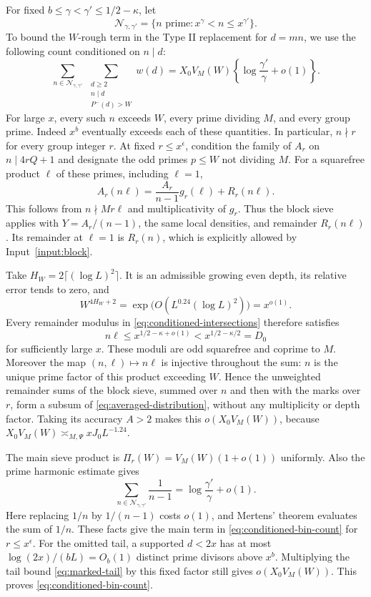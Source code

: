 For fixed $b\le\gamma<\gamma'\le1/2-\kappa$, let
\[
 \mathcal N_{\gamma,\gamma'}
     =\{n\text{ prime}:x^\gamma<n\le x^{\gamma'}\}.
\]
To bound the $W$-rough term in the Type II replacement for $d=mn$, we use
the following count conditioned on $n\mid d$:
\begin{equation}\label{eq:conditioned-bin-count}
 \sum_{n\in\mathcal N_{\gamma,\gamma'}}
 \ \sum_{\substack{d\ge2\\n\mid d\\P^-(d)>W}}w(d)
 =X_0V_M(W)\left\{\log\frac{\gamma'}\gamma+o(1)\right\}.
\end{equation}
For large $x$, every such $n$ exceeds $W$, every prime dividing $M$,
and every group prime.  Indeed $x^b$ eventually exceeds each of these
quantities.  In particular, $n\nmid r$ for every group integer $r$.
At fixed $r\le x^\epsilon$, condition the family of $A_r$ on
$n\mid4rQ+1$ and designate the odd primes $p\le W$ not dividing $M$.
For a squarefree product $\ell$ of these primes, including $\ell=1$,
\begin{equation}\label{eq:conditioned-intersections}
 A_r(n\ell)=\frac{A_r}{n-1}g_r(\ell)+R_r(n\ell).
\end{equation}
This follows from $n\nmid Mr\ell$ and multiplicativity of $g_r$.
Thus the block sieve applies with $Y=A_r/(n-1)$, the same local
densities, and remainder $R_r(n\ell)$.  Its remainder at $\ell=1$ is
$R_r(n)$, which is explicitly allowed by Input~\ref{input:block}.

Take $H_W=2\lceil(\log L)^2\rceil$.  It is an admissible growing even
depth, its relative error tends to zero, and
\[
 W^{4H_W+2}
    =\exp\bigl(O(L^{0.24}(\log L)^2)\bigr)=x^{o(1)}.
\]
Every remainder modulus in \eqref{eq:conditioned-intersections}
therefore satisfies
\[
 n\ell\le x^{1/2-\kappa+o(1)}<x^{1/2-\kappa/2}=D_0
\]
for sufficiently large $x$.  These moduli are odd squarefree and
coprime to $M$.  Moreover the map $(n,\ell)\mapsto n\ell$ is
injective throughout the sum: $n$ is the unique prime factor of this
product exceeding $W$.  Hence the unweighted remainder sums of the
block sieve, summed over $n$ and then with the marks over $r$, form a
subsum of \eqref{eq:averaged-distribution}, without any multiplicity
or depth factor.  Taking its accuracy $A>2$ makes this
$o(X_0V_M(W))$, because
$X_0V_M(W)\asymp_{M,\Psi}xJ_0L^{-1.24}$.

The main sieve product is $\Pi_r(W)=V_M(W)(1+o(1))$ uniformly.
Also the prime harmonic estimate gives
\[
 \sum_{n\in\mathcal N_{\gamma,\gamma'}}\frac1{n-1}
       =\log\frac{\gamma'}\gamma+o(1).
\]
Here replacing $1/n$ by $1/(n-1)$ costs $o(1)$, and Mertens' theorem
evaluates the sum of $1/n$.  These facts give the main term in
\eqref{eq:conditioned-bin-count} for $r\le x^\epsilon$.  For the
omitted tail, a supported $d<2x$ has at most
$\log(2x)/(bL)=O_b(1)$ distinct prime divisors above $x^b$.
Multiplying the tail bound \eqref{eq:marked-tail} by this fixed
factor still gives $o(X_0V_M(W))$.  This proves
\eqref{eq:conditioned-bin-count}.


